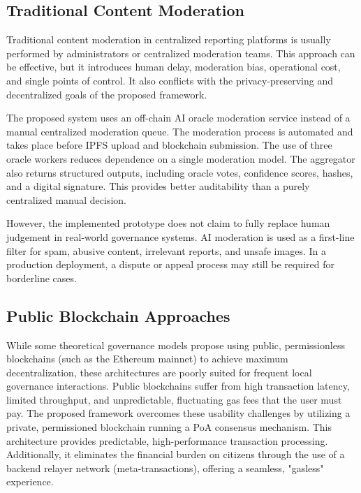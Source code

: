 \subsection{Traditional Content Moderation}
Traditional content moderation in centralized reporting platforms is usually
performed by administrators or centralized moderation teams. This approach can
be effective, but it introduces human delay, moderation bias, operational cost, and
single points of control. It also conflicts with the privacy-preserving and
decentralized goals of the proposed framework.

The proposed system uses an off-chain AI oracle moderation service instead of a
manual centralized moderation queue. The moderation process is automated and
takes place before IPFS upload and blockchain submission. The use of three oracle
workers reduces dependence on a single moderation model. The aggregator also
returns structured outputs, including oracle votes, confidence scores, hashes, and
a digital signature. This provides better auditability than a purely centralized
manual decision.

However, the implemented prototype does not claim to fully replace human
judgement in real-world governance systems. AI moderation is used as a first-line
filter for spam, abusive content, irrelevant reports, and unsafe images. In a
production deployment, a dispute or appeal process may still be required for
borderline cases.

\subsection{Public Blockchain Approaches}
While some theoretical governance models propose using public, permissionless blockchains (such as the Ethereum mainnet) to achieve maximum decentralization, these architectures are poorly suited for frequent local governance interactions. Public blockchains suffer from high transaction latency, limited throughput, and unpredictable, fluctuating gas fees that the user must pay. 
The proposed framework overcomes these usability challenges by utilizing a private, permissioned blockchain running a \ac{PoA} consensus mechanism. This architecture provides predictable, high-performance transaction processing. Additionally, it eliminates the financial burden on citizens through the use of a backend relayer network (meta-transactions), offering a seamless, "gasless" experience.

